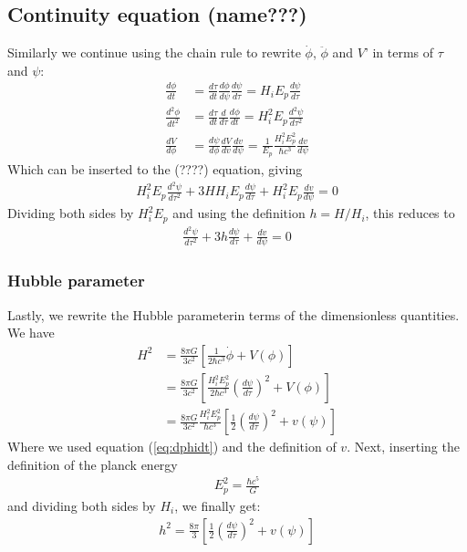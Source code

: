 \documentclass[reprint,english,notitlepage]{revtex4-1}  %
\numberwithin{equation}{section}
\begin{document}
\subsection{Continuity equation (name???)}
Similarly we continue using the chain rule to rewrite $\dot{\phi}$,
$\ddot{\phi}$ and $V$' in terms of $\tau$ and $\psi$:
\begin{align}
	\frac{d\phi}{dt} &= \frac{d\tau}{dt}\frac{d\phi}{d\psi}\frac{d\psi}{d\tau} \label{eq:dphidt}
									 = H_i E_p \frac{d\psi}{d\tau} \\
  \frac{d^2\phi}{dt^2} &= \frac{d\tau}{dt}\frac{d}{d\tau}\frac{d\phi}{dt}
									 = H_i^2 E_p \frac{d^2\psi}{d\tau^2} \\
	\frac{dV}{d\phi} &= \frac{d\psi}{d\phi}\frac{dV}{dv}\frac{dv}{d\psi}
									 = \frac{1}{E_p} \frac{H_i^2 E_p^2}{\hbar c^3} \frac{dv}{d\psi}
\end{align}
Which can be inserted to the (????) equation, giving
\begin{align}
	H_i^2 E_p \frac{d^2\psi}{d\tau^2} + 3H H_i E_p \frac{d\psi}{d\tau}
				+ H_i^2 E_p \frac{dv}{d\psi} = 0
\end{align}
Dividing both sides by $H_i^2 E_p$ and using the definition $h=H/H_i$, this
reduces to
\begin{align}
	\frac{d^2\psi}{d\tau^2} + 3h\frac{d\psi}{d\tau} + \frac{dv}{d\psi} = 0 \label{eq:eom}
\end{align}
\subsubsection{Hubble parameter}
Lastly, we rewrite the Hubble parameterin terms of the dimensionless quantities.
We have
\begin{align}
	H^2 &= \frac{8\pi G}{3 c^2}\left[ \frac{1}{2\hbar c^3}\dot{\phi} + V(\phi)\right] \\
			&= \frac{8\pi G}{3 c^2}\left[ \frac{H_i^2 E_p^2}{2\hbar c^3}\left(\frac{d\psi}{d\tau}\right)^2 + V(\phi)\right] \\
			&= \frac{8\pi G}{3 c^2}\frac{H_i^2 E_p^2}{\hbar c^3}\left[\frac{1}{2}\left(\frac{d\psi}{d\tau}\right)^2 + v(\psi)\right]
\end{align}
Where we used equation (\ref{eq:dphidt}) and the definition of $v$. Next,
inserting the definition of the planck energy
\begin{align}
	E_p^2 = \frac{\hbar c^5}{G}
\end{align}
and dividing both sides by $H_i$, we finally get:
\begin{align}
	h^2 = \frac{8\pi}{3}\left[ \frac{1}{2}\left(\frac{d\psi}{d\tau}\right)^2 + v(\psi)\right] \label{eq:h}
\end{align}
\end{document}
